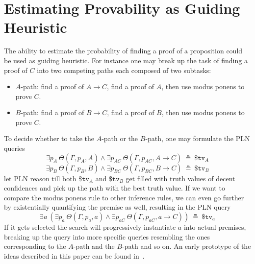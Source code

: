 \documentclass{easychair}
\begin{document}
\section{Estimating Provability as Guiding Heuristic}

The ability to estimate the probability of finding a proof of a
proposition could be used as guiding heuristic.  For instance one may
break up the task of finding a proof of $C$ into two competing paths
each composed of two subtasks:
\begin{itemize}
\item $A$-path: find a proof of $A \to C$, find a proof of $A$,
  then use modus ponens to prove $C$.
\item $B$-path: find a proof of $B \to C$, find a proof of $B$,
  then use modus ponens to prove $C$.
\end{itemize}
To decide whether to take the $A$-path or the $B$-path, one may
formulate the PLN queries
$$\exists p_A\ \Theta(\Gamma, p_A, A) \land \exists
p_{AC}\ \Theta(\Gamma, p_{AC}, A \to C)\ \measeq\ \$\texttt{tv}_A$$
$$\exists p_B\ \Theta(\Gamma, p_B, B) \land \exists
p_{BC}\ \Theta(\Gamma, p_{BC}, B \to C)\ \measeq\ \$\texttt{tv}_B$$ let
PLN reason till both $\$\texttt{tv}_A$ and $\$\texttt{tv}_B$ get
filled with truth values of decent confidences and pick up the path
with the best truth value.  If we want to compare the modus ponens
rule to other inference rules, we can even go further by existentially
quantifying the premise as well, resulting in the PLN query
$$\exists a\ \left(\exists p_a\ \Theta(\Gamma, p_a, a) \land \exists
p_{aC}\ \Theta(\Gamma, p_{aC}, a \to
C)\right)\ \measeq\ \$\texttt{tv}_a$$ If it gets selected the search
will progressively instantiate $a$ into actual premises, breaking up
the query into more specific queries resembling the ones corresponding
to the $A$-path and the $B$-path and so on.  An early prototype of the
ideas described in this paper can be found
in~\cite{Geisweiller2025PICM}.

\newpage



\label{sect:bib}
%
%
%


\newpage


\appendix

\end{document}
